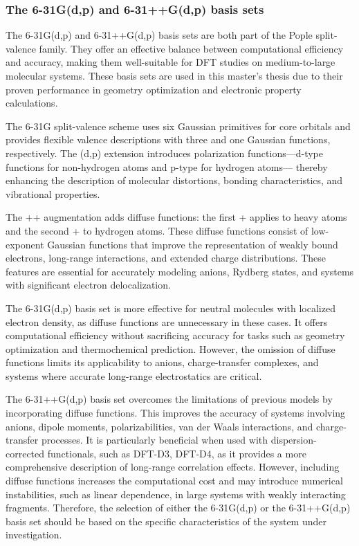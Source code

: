 \subsubsection{The 6-31G(d,p) and 6-31++G(d,p) basis sets}
 
The 6-31G(d,p) and 6-31++G(d,p) basis sets are both part of the Pople split-valence family. They offer an effective balance between computational efficiency and accuracy, making them well-suitable for DFT studies on medium-to-large molecular systems. These basis sets are used in this master’s thesis due to their proven performance in geometry optimization and electronic property calculations. 

The 6-31G split-valence scheme uses six Gaussian primitives for core orbitals and provides flexible valence descriptions with three and one Gaussian functions, respectively. The (d,p) extension introduces polarization functions—d-type functions for non-hydrogen atoms and p-type for hydrogen atoms— thereby enhancing the description of molecular distortions, bonding characteristics, and vibrational properties. 

The ++ augmentation adds diffuse functions: the first + applies to heavy atoms and the second + to hydrogen atoms. These diffuse functions consist of low-exponent Gaussian functions that improve the representation of weakly bound electrons, long-range interactions, and extended charge distributions. These features are essential for accurately modeling anions, Rydberg states, and systems with significant electron delocalization. 

The 6-31G(d,p) basis set is more effective for neutral molecules with localized electron density, as diffuse functions are unnecessary in these cases. It offers computational efficiency without sacrificing accuracy for tasks such as geometry optimization and thermochemical prediction. However, the omission of diffuse functions limits its applicability to anions, charge-transfer complexes, and systems where accurate long-range electrostatics are critical. 

The 6-31++G(d,p) basis set overcomes the limitations of previous models by incorporating diffuse functions. This improves the accuracy of systems involving anions, dipole moments, polarizabilities, van der Waals interactions, and charge-transfer processes. It is particularly beneficial when used with dispersion- corrected functionals, such as DFT-D3, DFT-D4, as it provides a more comprehensive description of long-range correlation effects. However, including diffuse functions increases the computational cost and may introduce numerical instabilities, such as linear dependence, in large systems with weakly interacting fragments. Therefore, the selection of either the 6-31G(d,p) or the 6-31++G(d,p) basis set should be based on the specific characteristics of the system under investigation. 

